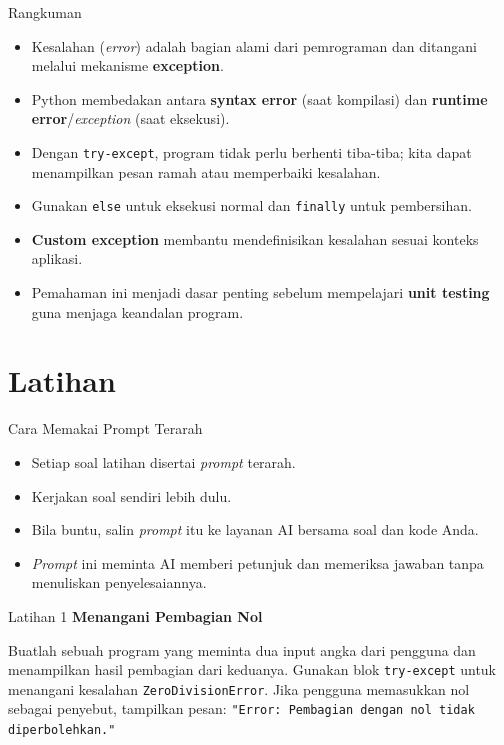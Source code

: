 \documentclass[aspectratio=169, table]{beamer}
\begin{document}
\begin{frame}{Rangkuman}
\vspace*{15pt}
\begin{itemize}
  \item Kesalahan (\textit{error}) adalah bagian alami dari pemrograman dan ditangani melalui mekanisme \textbf{exception}.
  \item Python membedakan antara \textbf{syntax error} (saat kompilasi) dan \textbf{runtime error}/\textit{exception} (saat eksekusi).
  \item Dengan \texttt{try-except}, program tidak perlu berhenti tiba-tiba; kita dapat menampilkan pesan ramah atau memperbaiki kesalahan.
  \item Gunakan \texttt{else} untuk eksekusi normal dan \texttt{finally} untuk pembersihan.
  \item \textbf{Custom exception} membantu mendefinisikan kesalahan sesuai konteks aplikasi.
  \item Pemahaman ini menjadi dasar penting sebelum mempelajari \textbf{unit testing} guna menjaga keandalan program.
\end{itemize}
\end{frame}





\section{Latihan}
\begin{frame}{Cara Memakai Prompt Terarah}
\begin{itemize}
\item Setiap soal latihan disertai \textit{prompt} terarah.
\item Kerjakan soal sendiri lebih dulu.
\item Bila buntu, salin \textit{prompt} itu ke layanan AI bersama soal dan kode Anda.
\item \textit{Prompt} ini meminta AI memberi petunjuk dan memeriksa jawaban tanpa menuliskan penyelesaiannya.
\end{itemize}
\end{frame}

\begin{frame}[fragile,allowframebreaks=0.8]{Latihan 1}
\footnotesize
\textbf{Menangani Pembagian Nol}\par\medskip
Buatlah sebuah program yang meminta dua input angka dari pengguna dan menampilkan hasil pembagian dari keduanya.  
    Gunakan blok \texttt{try-except} untuk menangani kesalahan \texttt{ZeroDivisionError}.  
    Jika pengguna memasukkan nol sebagai penyebut, tampilkan pesan:  
    \texttt{"Error: Pembagian dengan nol tidak diperbolehkan."}
\end{frame}
\end{document}
